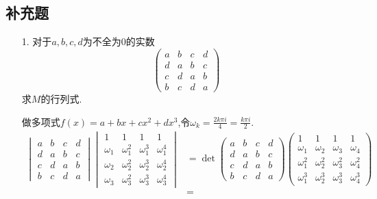 \documentclass{article}
\begin{document}
\subsection{补充题}
\begin{enumerate}
    \item [1.]对于$a,b,c,d$为不全为$0$的实数
    \[
        \begin{pmatrix}
            a & b & c & d\\
            d & a & b & c\\
            c & d & a & b\\
            b & c & d & a
        \end{pmatrix}
    \]
    求$M$的行列式.

    做多项式$f(x)=a+bx+cx^2+dx^3$,令$\omega_{k}=\frac{2k\pi i}{4}=\frac{k\pi i}{2}$.
    \begin{align*}
        \begin{vmatrix}
            a & b & c & d\\
            d & a & b & c\\
            c & d & a & b\\
            b & c & d & a
        \end{vmatrix}
        \begin{vmatrix}
            1 & 1 & 1 & 1\\
            \omega_1 & \omega_1^2 & \omega_1^3 & \omega_1^4\\
            \omega_2 & \omega_2^2 & \omega_2^3 & \omega_2^4\\
            \omega_3 & \omega_3^2 & \omega_3^3 & \omega_3^4
        \end{vmatrix}
        &=
        \det
        \begin{pmatrix}
            a & b & c & d\\
            d & a & b & c\\
            c & d & a & b\\
            b & c & d & a
        \end{pmatrix}
        \begin{pmatrix}
            1 & 1 & 1 & 1\\
            \omega_1 & \omega_2 & \omega_3 & \omega_4\\
            \omega_1^2 & \omega_2^2 & \omega_3^2 & \omega_4^2\\
            \omega_1^3 & \omega_2^3 & \omega_3^3 & \omega_4^3
        \end{pmatrix}\\
        &=

\end{align*}
\end{enumerate}
\end{document}
